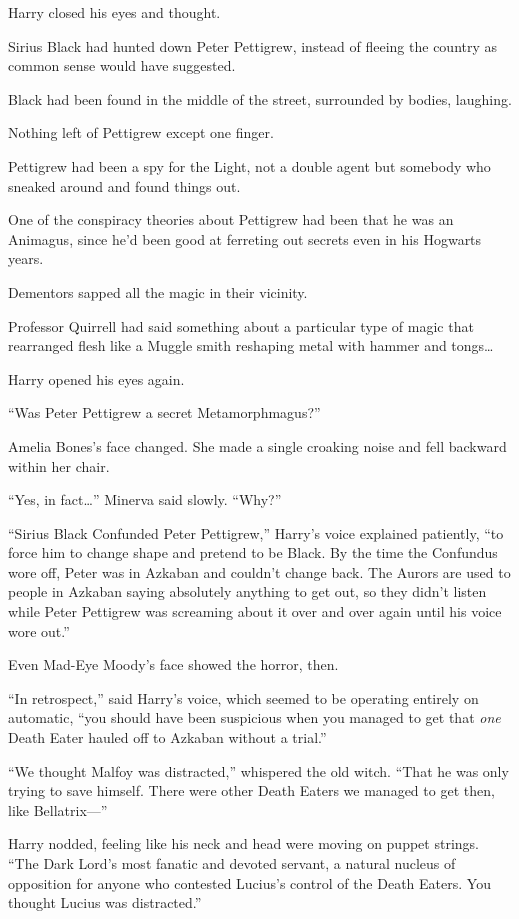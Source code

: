 Harry closed his eyes and thought.

Sirius Black had hunted down Peter Pettigrew, instead of fleeing the country as common sense would have suggested.

Black had been found in the middle of the street, surrounded by bodies, laughing.

Nothing left of Pettigrew except one finger.

Pettigrew had been a spy for the Light, not a double agent but somebody who sneaked around and found things out.

One of the conspiracy theories about Pettigrew had been that he was an Animagus, since he’d been good at ferreting out secrets even in his Hogwarts years.

Dementors sapped all the magic in their vicinity.

Professor Quirrell had said something about a particular type of magic that rearranged flesh like a Muggle smith reshaping metal with hammer and tongs…

Harry opened his eyes again.

“Was Peter Pettigrew a secret Metamorphmagus?”

Amelia Bones’s face changed. She made a single croaking noise and fell backward within her chair.

“Yes, in fact…” Minerva said slowly. “Why?”

“Sirius Black Confunded Peter Pettigrew,” Harry’s voice explained patiently, “to force him to change shape and pretend to be Black. By the time the Confundus wore off, Peter was in Azkaban and couldn’t change back. The Aurors are used to people in Azkaban saying absolutely anything to get out, so they didn’t listen while Peter Pettigrew was screaming about it over and over again until his voice wore out.”

Even Mad-Eye Moody’s face showed the horror, then.

“In retrospect,” said Harry’s voice, which seemed to be operating entirely on automatic, “you should have been suspicious when you managed to get that \emph{one} Death Eater hauled off to Azkaban without a trial.”

“We thought Malfoy was distracted,” whispered the old witch. “That he was only trying to save himself. There were other Death Eaters we managed to get then, like Bellatrix—”

Harry nodded, feeling like his neck and head were moving on puppet strings. “The Dark Lord’s most fanatic and devoted servant, a natural nucleus of opposition for anyone who contested Lucius’s control of the Death Eaters. You thought Lucius was distracted.”

